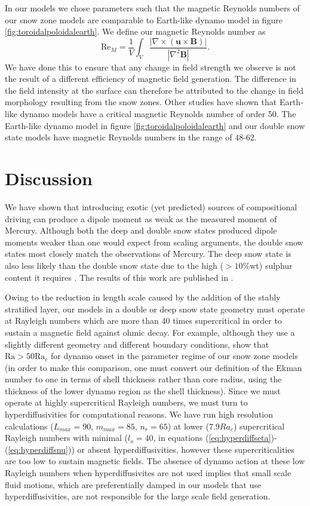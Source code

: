 In our models we chose parameters such that the magnetic Reynolds numbers of our snow zone models are comparable to Earth-like dynamo model in figure \ref{fig:toroidalpoloidalearth}. We define our magnetic Reynolds number as
\begin{equation}
\mathrm{Re}_{M}=\frac{1}{V}\int_{V}\frac{\left|\nabla\times\left(\mathbf{u}\times\mathbf{B}\right)\right|}{\left|\nabla^{2}\mathbf{B}\right|}.
\end{equation}
We have done this to ensure that any change in field strength we observe is not the result of a different efficiency of magnetic field generation. The difference in the field intensity at the surface can therefore be attributed to the change in field morphology resulting from the snow zones. Other studies  \citep{christensen06scaling} have shown that Earth-like dynamo models have a critical magnetic Reynolds number of order 50. The Earth-like dynamo model in figure \ref{fig:toroidalpoloidalearth} and our double snow state models have magnetic Reynolds numbers in the range of $48$-$62$.

\section{Discussion}
We have shown that introducing exotic (yet predicted) sources of compositional driving can produce a dipole moment as weak as the measured moment of Mercury. Although both the deep and double snow states produced dipole moments weaker than one would expect from scaling arguments, the double snow states most closely match the observations of Mercury. The deep snow state is also less likely than the double snow state due to the high ($>10\%$wt) sulphur content it requires \citep{rivoldini09}. The results of this work are published in \citet{vilim2010}.

Owing to the reduction in length scale caused by the addition of the stably stratified layer, our models in a double or deep snow state geometry must operate at Rayleigh numbers which are more than $40$ times supercritical in order to sustain a magnetic field against ohmic decay. For example, although they use a slightly different geometry and different boundary conditions, \citet{christensen06} show that $\mathrm{Ra}>50\mathrm{Ra}_{c}$ for dynamo onset in the parameter regime of our snow zone models (in order to make this comparison, one must convert our definition of the Ekman number to one in terms of shell thickness rather than core radius, using the thickness of the lower dynamo region as the shell thickness). Since we must operate at highly supercritical Rayleigh numbers, we must turn to hyperdiffusivities for computational reasons. We have run high resolution calculations  ($L_{max}=90$, $m_{max}=85$, $n_{r}=65$) at lower ($7.9 Ra_{c}$) supercritical Rayleigh numbers with minimal ($l_{o}=40$, in equations (\ref{eq:hyperdiffseta})-(\ref{eq:hyperdiffsnu})) or absent hyperdiffusivities, however these supercriticalities are too low to sustain magnetic fields. The absence of dynamo action at these low Rayleigh numbers when hyperdiffusivites are not used implies that small scale fluid motions, which are preferentially damped in our models that use hyperdiffusivities, are not responsible for the large scale field generation.

